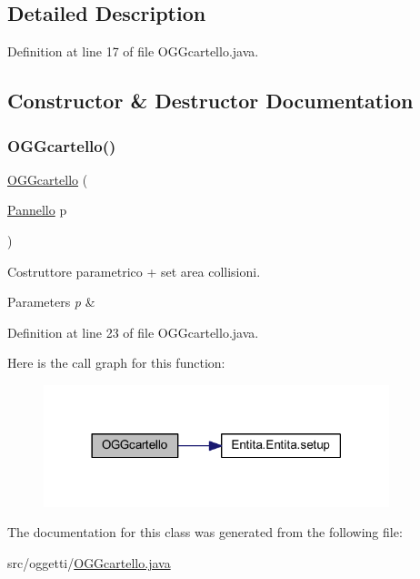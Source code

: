 \subsection{Detailed Description}


Definition at line 17 of file O\+G\+Gcartello.\+java.



\subsection{Constructor \& Destructor Documentation}
\mbox{\label{classoggetti_1_1_o_g_gcartello_ad8ef3a2b8459eb976a19d634edb986f9}} 
\subsubsection{\texorpdfstring{O\+G\+Gcartello()}{OGGcartello()}}
{\footnotesize\ttfamily \hyperlink{classoggetti_1_1_o_g_gcartello}{O\+G\+Gcartello} (\begin{DoxyParamCaption}\item[{\hyperlink{classa_1_1survival_1_1game_1_1_pannello}{Pannello}}]{p }\end{DoxyParamCaption})}



Costruttore parametrico + set area collisioni. 


\begin{DoxyParams}{Parameters}
{\em p} & \\
\hline
\end{DoxyParams}


Definition at line 23 of file O\+G\+Gcartello.\+java.

Here is the call graph for this function\+:
\nopagebreak
\begin{figure}[H]
\begin{center}
\leavevmode
\includegraphics[width=285pt]{classoggetti_1_1_o_g_gcartello_ad8ef3a2b8459eb976a19d634edb986f9_cgraph}
\end{center}
\end{figure}


The documentation for this class was generated from the following file\+:\begin{DoxyCompactItemize}
\item 
src/oggetti/\hyperlink{_o_g_gcartello_8java}{O\+G\+Gcartello.\+java}\end{DoxyCompactItemize}

